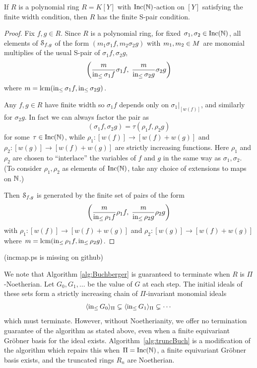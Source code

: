 \begin{proposition}
 If $R$ is a polynomial ring $R = K[Y]$ with $\operatorname{Inc}(\mathbb N)$-action on $[Y]$ satisfying the finite width condition, then $R$ has the finite S-pair condition.
\end{proposition}
\begin{proof}
 Fix $f,g \in R$.
 Since $R$ is a polynomial ring, for fixed $\sigma_1,\sigma_2 \in \operatorname{Inc}(\mathbb N)$, all elements of $\mathcal S_{f,g}$ of the form $(m_1\sigma_1 f, m_2\sigma_2 g)$ with $m_1,m_2 \in M$ are monomial multiplies of the usual S-pair of $\sigma_1 f, \sigma_2 g$,
  \[ \left(\frac{m}{\operatorname{in}_{\leq} \sigma_1 f} \sigma_1 f,\; \frac{m}{\operatorname{in}_{\leq} \sigma_2 g} \sigma_2 g\right) \]
 where $m = \operatorname{lcm}(\operatorname{in}_{\leq} \sigma_1 f,\operatorname{in}_{\leq} \sigma_2 g)$.

 Any $f,g \in R$ have finite width so $\sigma_1 f$ depends only on $\sigma_1|_{[w(f)]}$, and similarly for $\sigma_2 g$.  In fact we can always factor the pair as
  \[ (\sigma_1 f, \sigma_2 g) = \tau(\rho_1 f, \rho_2 g) \]
 for some $\tau \in \operatorname{Inc}(\mathbb N)$, while $\rho_1:[w(f)] \to [w(f) + w(g)]$ and $\rho_2:[w(g)] \to [w(f) + w(g)]$ are strictly increasing functions.  Here $\rho_1$ and $\rho_2$ are chosen to ``interlace'' the variables of $f$ and $g$ in the same way as $\sigma_1,\sigma_2$.  (To consider $\rho_1,\rho_2$ as elements of $\operatorname{Inc}(\mathbb N)$, take any choice of extensions to maps on $\mathbb N$.)
 
 Then $\mathcal S_{f,g}$ is generated by the finite set of pairs of the form
  \[ \left(\frac{m}{\operatorname{in}_{\leq} \rho_1 f} \rho_1 f,\; \frac{m}{\operatorname{in}_{\leq} \rho_2 g} \rho_2 g\right) \]
 with $\rho_1:[w(f)] \to [w(f) + w(g)]$ and $\rho_2:[w(g)] \to [w(f) + w(g)]$ where $m = \operatorname{lcm}(\operatorname{in}_{\leq} \rho_1 f,\operatorname{in}_{\leq} \rho_2 g)$.
\end{proof}
{\color{red} (incmap.ps is missing on github)}

We note that Algorithm \ref{alg:Buchberger} is guaranteed to terminate when $R$ is $\Pi$-Noetherian.  Let $G_0,G_1,\ldots$ be the value of $G$ at each step.  The initial ideals of these sets form a strictly increasing chain of $\Pi$-invariant monomial ideals
 \[ \langle \operatorname{in}_{\leq} G_0 \rangle_\Pi \subsetneq \langle \operatorname{in}_{\leq} G_1 \rangle_\Pi \subsetneq \cdots \]
which must terminate.  However, without Noetherianity, we offer no termination guarantee of the algorithm as stated above, even when a finite equivariant Gr\"obner basis for the ideal exists.  Algorithm~\ref{alg:truncBuch} is a modification of the algorithm which repairs this when $\Pi = \operatorname{Inc}(\mathbb N)$, a finite equivariant Gr\"obner basis exists, and the truncated rings $R_n$ are Noetherian.

